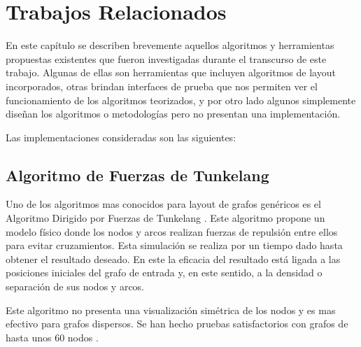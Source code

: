 \label{cap_trabajos_relacionados}
\chapter{Trabajos Relacionados}
En este capítulo se describen brevemente aquellos algoritmos y herramientas propuestas existentes que fueron investigadas durante el transcurso de este trabajo. Algunas de ellas son herramientas que incluyen algoritmos de layout incorporados, otras brindan interfaces de prueba que nos permiten ver el funcionamiento de los algoritmos teorizados, y por otro lado algunos simplemente diseñan los algoritmos o metodologías pero no presentan una implementación.

Las implementaciones consideradas son las siguientes: 


\section{Algoritmo de Fuerzas de Tunkelang}
Uno de los algoritmos mas conocidos para layout de grafos genéricos es el Algoritmo Dirigido por Fuerzas de Tunkelang \cite{tunkelang1998jiggle}. Este algoritmo  propone un modelo físico donde los nodos y arcos realizan fuerzas de repulsión entre ellos para evitar cruzamientos. Esta simulación se realiza por un tiempo dado hasta obtener el resultado deseado. En este la eficacia del resultado está ligada a las posiciones iniciales del grafo de entrada y, en este sentido, a la densidad o separación de sus nodos y arcos.

Este algoritmo no presenta una visualización simétrica de los nodos y es mas efectivo para grafos dispersos. Se han hecho pruebas satisfactorios con grafos de hasta unos 60 nodos \cite{gibson2013survey}.

